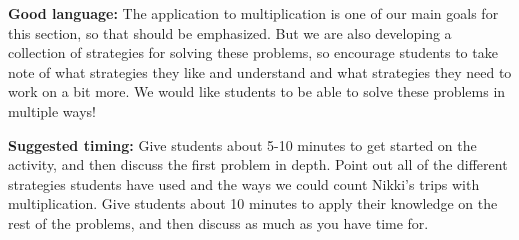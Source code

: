 \documentclass[nooutcomes,noauthor]{ximera}
\begin{document}
\begin{instructorNotes}
{\bf Good language:} The application to multiplication is one of our main goals for this section, so that should be emphasized. But we are also developing a collection of strategies for solving these problems, so encourage students to take note of what strategies they like and understand and what strategies they need to work on a bit more. We would like students to be able to solve these problems in multiple ways!


{\bf Suggested timing:} Give students about 5-10 minutes to get started on the activity, and then discuss the first problem in depth. Point out all of the different strategies students have used and the ways we could count Nikki's trips with multiplication. Give students about 10 minutes to apply their knowledge on the rest of the problems, and then discuss as much as you have time for.

\end{instructorNotes}
\end{document}
